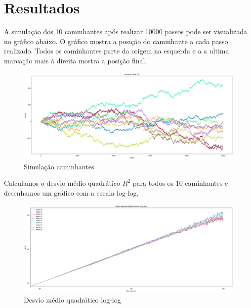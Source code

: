 
\chapter{Resultados}

A simulação dos 10 caminhantes após realizar 10000 passos pode ser visualizada no gráfico abaixo. O gráfico mostra a posição do caminhante a cada passo realizado. Todos os caminhantes parte da origem na esquerda e a a ultima marcação mais à direita mostra a posição final. 

\begin{figure}[!htb]
  \centering
  \caption{Simulação caminhantes}
  \label{simulacao_caminhates}
  \includegraphics[width=1\textwidth]{figuras/output_0.png}
\end{figure}

Calculamos o desvio médio quadrático $R^{2}$ para todos os 10 caminhantes e desenhamos um gráfico com a escala log-log. 

\begin{figure}[!htb]
  \centering
  \caption{Desvio médio quadrático log-log}
  \label{devio_medio}
  \includegraphics[width=1\textwidth]{figuras/output_1.png}
\end{figure}

